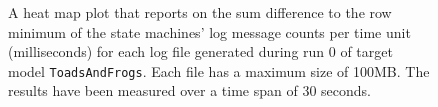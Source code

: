 \begin{figure}[htbp]
\centering
\begin{minipage}{1\textwidth}
  \centering
\end{minipage}
\caption{A heat map plot that reports on the sum difference to the row minimum of the state machines' log message counts per time unit (milliseconds) for each log file generated during run 0 of target model \texttt{ToadsAndFrogs}. Each file has a maximum size of 100MB. The results have been measured over a time span of 30 seconds.}
\label{figure:throughput_difference_toadsandfrogs_0}
\end{figure}